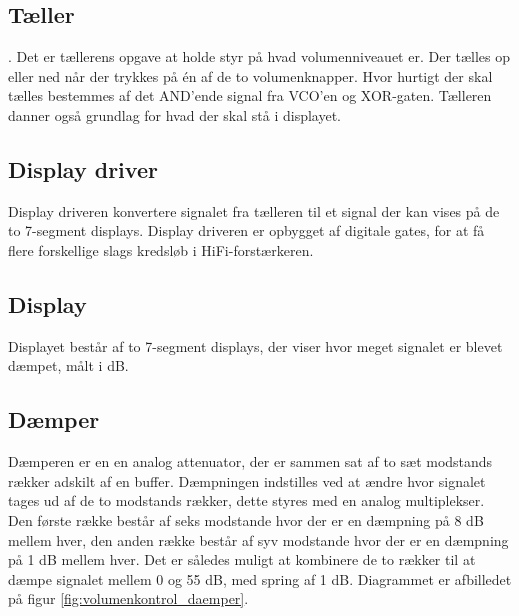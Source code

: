 \subsection*{Tæller}
\label{volumenkontrol-simulering-taeller}
.
Det er tællerens opgave at holde styr på hvad volumenniveauet er. Der tælles op eller ned når der trykkes på én af de to volumenknapper. Hvor hurtigt der skal tælles bestemmes af det AND'ende signal fra VCO'en og XOR-gaten. Tælleren danner også grundlag for hvad der skal stå i displayet.

\subsection*{Display driver}
\label{volumenkontrol-simulering-display_driver}

Display driveren konvertere signalet fra tælleren til et signal der kan vises på de to 7-segment displays. Display driveren er opbygget af digitale gates, for at få flere forskellige slags kredsløb i HiFi-forstærkeren.

\subsection*{Display}
\label{volumenkontrol-simulering-display}

Displayet består af to 7-segment displays, der viser hvor meget signalet er blevet dæmpet, målt i dB.

\subsection*{Dæmper}
\label{volumenkontrol-simulering-daemper}

Dæmperen er en en analog attenuator, der er sammen sat af to sæt modstands rækker adskilt af en buffer. Dæmpningen indstilles ved at ændre hvor signalet tages ud af de to modstands rækker, dette styres med en analog multiplekser. Den første række består af seks modstande hvor der er en dæmpning på 8 dB mellem hver, den anden række består af syv modstande hvor der er en dæmpning på 1 dB mellem hver. Det er således muligt at kombinere de to rækker til at dæmpe signalet mellem 0 og 55 dB, med spring af 1 dB. Diagrammet er afbilledet på figur \ref{fig:volumenkontrol_daemper}.

